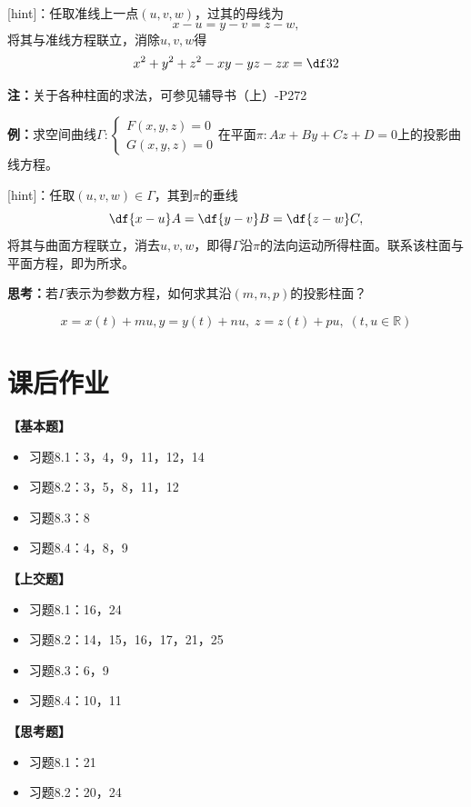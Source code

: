 [hint]：任取准线上一点$(u,v,w)$，过其的母线为
$$x-u=y-v=z-w,$$
将其与准线方程联立，消除$u,v,w$得
$$x^2+y^2+z^2-xy-yz-zx=\df32$$

{\bf 注：}关于各种柱面的求法，可参见辅导书（上）-P272

{\bf 例：}求空间曲线$\Gamma:\left\{\begin{array}{l}
F(x,y,z)=0\\ G(x,y,z)=0
\end{array}\right.$在平面$\pi:Ax+By+Cz+D=0$上的投影曲线方程。

[hint]：任取$(u,v,w)\in\Gamma$，其到$\pi$的垂线
$$\df{x-u}A=\df{y-v}B=\df{z-w}C,$$
将其与曲面方程联立，消去$u,v,w$，即得$\Gamma$沿$\pi$的法向运动所得柱面。联系该柱面与
平面方程，即为所求。

{\bf 思考：}若$\Gamma$表示为参数方程，如何求其沿$(m,n,p)$的投影柱面？

$$x=x(t)+mu,y=y(t)+nu,\;z=z(t)+pu,\;(t,u\in\mathbb{R})$$

\newpage

\section*{课后作业}

{\bf 【基本题】}

\begin{itemize}
  \setlength{\itemindent}{1cm}
  \item 习题8.1：3，4，9，11，12，14
  \item 习题8.2：3，5，8，11，12
  \item 习题8.3：8
  \item 习题8.4：4，8，9
\end{itemize}

{\bf 【上交题】}

\begin{itemize}
  \setlength{\itemindent}{1cm}
  \item 习题8.1：16，24
  \item 习题8.2：14，15，16，17，21，25
  \item 习题8.3：6，9
  \item 习题8.4：10，11
\end{itemize}


{\bf 【思考题】}

\begin{itemize}
  \setlength{\itemindent}{1cm}
  \item 习题8.1：21
  \item 习题8.2：20，24
\end{itemize}

